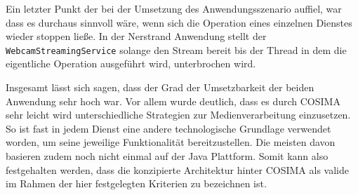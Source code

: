   Ein letzter Punkt der bei der Umsetzung des Anwendungsszenario auffiel, war dass es durchaus sinnvoll wäre, wenn sich die Operation eines einzelnen Dienstes wieder stoppen ließe. In der Nerstrand Anwendung stellt der \verb!WebcamStreamingService! solange den Stream bereit bis der Thread in dem die eigentliche Operation ausgeführt wird, unterbrochen wird.


  Insgesamt lässt sich sagen, dass der Grad der Umsetzbarkeit der beiden Anwendung sehr hoch war. Vor allem wurde deutlich, dass es durch COSIMA sehr leicht wird unterschiedliche Strategien zur Medienverarbeitung einzusetzen. So ist fast in jedem Dienst eine andere technologische Grundlage verwendet worden, um seine jeweilige Funktionalität bereitzustellen. Die meisten davon basieren zudem noch nicht einmal auf der Java Plattform. Somit kann also festgehalten werden, dass die konzipierte Architektur hinter COSIMA als valide im Rahmen der hier festgelegten Kriterien zu bezeichnen ist.

